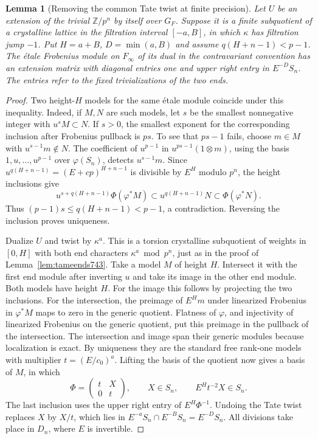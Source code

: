 \documentclass[a4paper,11pt]{article}
\newtheorem{lemma}[proposition]{Lemma}
\theoremstyle{definition}
\theoremstyle{remark}
\numberwithin{equation}{section}
\begin{document}
\begin{lemma}[Removing the common Tate twist at finite precision]
\leavevmode\label{lem:shortpole748}
Let \(U\) be an extension of the trivial \(\mathbb Z/p^n\) by
itself over \(G_F\). Suppose it is a finite subquotient of a
crystalline lattice in the filtration interval \([-a,B]\),
in which \(\kappa\) has filtration jump \(-1\). Put \(H=a+B\),
\(D=\min(a,B)\) and assume \(q(H+n-1)<p-1\).
The \'etale Frobenius module on \(F_\infty\) of its dual in
the contravariant convention has an extension matrix with
diagonal entries one and upper right entry in \(E^{-D}S_n\).
The entries refer to the fixed trivializations of the two ends.
\end{lemma}
\begin{proof}
Two height-\(H\) models for the same \'etale module coincide
under this inequality. Indeed, if \(M,N\) are such models,
let \(s\) be the smallest nonnegative integer with \(u^sM\subset N\).
If \(s>0\), the smallest exponent for the corresponding inclusion
after Frobenius pullback is \(ps\). To see that \(ps-1\) fails,
choose \(m\in M\) with \(u^{s-1}m\notin N\). The coefficient
of \(u^{p-1}\) in \(u^{ps-1}(1\otimes m)\), using the basis
\(1,u,\ldots,u^{p-1}\) over \(\varphi(S_n)\), detects
\(u^{s-1}m\). Since \(u^{q(H+n-1)}=(E+cp)^{H+n-1}\) is
divisible by \(E^H\) modulo \(p^n\), the height inclusions give
\[
 u^{s+q(H+n-1)}\Phi(\varphi^*M)
       \subset u^{q(H+n-1)}N\subset\Phi(\varphi^*N).
\]
Thus \((p-1)s\le q(H+n-1)<p-1\), a contradiction. Reversing
the inclusion proves uniqueness.

Dualize \(U\) and twist by \(\kappa^a\). This is a torsion
crystalline subquotient of weights in \([0,H]\) with both end
characters \(\kappa^a\bmod p^n\), just as in the proof of
Lemma~\ref{lem:tameends743}. Take a model \(M\) of height \(H\).
Intersect it with the first end module after inverting \(u\)
and take its image in the other end module. Both models have
height \(H\). For the image this follows by projecting the
two inclusions. For the intersection, the preimage of \(E^Hm\)
under linearized Frobenius in \(\varphi^*M\) maps to zero in
the generic quotient. Flatness of \(\varphi\), and injectivity
of linearized Frobenius on the generic quotient, put this
preimage in the pullback of the intersection. The intersection
and image span their generic modules because localization is
exact. By uniqueness they are the standard free rank-one
models with multiplier \(t=(E/c_0)^a\). Lifting the basis of
the quotient now gives a basis of \(M\), in which
\[
             \Phi=\begin{pmatrix}t&X\\0&t\end{pmatrix},
             \qquad X\in S_n,\qquad E^H t^{-2}X\in S_n .
\]
The last inclusion uses the upper right entry of \(E^H\Phi^{-1}\).
Undoing the Tate twist replaces \(X\) by \(X/t\), which lies in
\(E^{-a}S_n\cap E^{-B}S_n=E^{-D}S_n\). All divisions take
place in \(D_n\), where \(E\) is invertible.
\end{proof}
\end{document}
